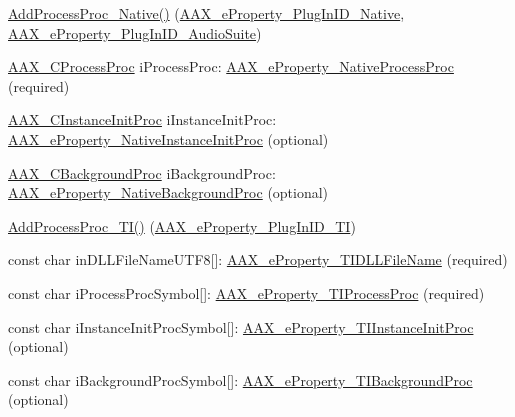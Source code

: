 \mbox{\hyperlink{a01781_a1c069508cf54a523905c8160ebf628ad}{Add\+Process\+Proc\+\_\+\+Native()}} (\mbox{\hyperlink{a00662_a13e384f22825afd3db6d68395b79ce0da89ca3dd6e96895cda14976c1b1ceb826}{A\+A\+X\+\_\+e\+Property\+\_\+\+Plug\+In\+I\+D\+\_\+\+Native}}, \mbox{\hyperlink{a00662_a13e384f22825afd3db6d68395b79ce0dad3344696b8298a8b254add3d039ea927}{A\+A\+X\+\_\+e\+Property\+\_\+\+Plug\+In\+I\+D\+\_\+\+Audio\+Suite}})
\begin{DoxyItemize}
\item \mbox{\hyperlink{a00401_ad6dd5e1aa5bd2f8462966685e3b26a6e}{A\+A\+X\+\_\+\+C\+Process\+Proc}} {\ttfamily i\+Process\+Proc\+:} \mbox{\hyperlink{a00662_a13e384f22825afd3db6d68395b79ce0da43e55994526d4623cab23fc3200d3762}{A\+A\+X\+\_\+e\+Property\+\_\+\+Native\+Process\+Proc}} (required)
\item \mbox{\hyperlink{a00401_a3963a850079d3186e08c97a1a4d0ef1c}{A\+A\+X\+\_\+\+C\+Instance\+Init\+Proc}} {\ttfamily i\+Instance\+Init\+Proc\+:} \mbox{\hyperlink{a00662_a13e384f22825afd3db6d68395b79ce0da0f182ea271ec0aa1a49dd9c995826ef5}{A\+A\+X\+\_\+e\+Property\+\_\+\+Native\+Instance\+Init\+Proc}} (optional)
\item \mbox{\hyperlink{a00401_aa64561d963284a3124a0821e7dc79c9a}{A\+A\+X\+\_\+\+C\+Background\+Proc}} {\ttfamily i\+Background\+Proc\+:} \mbox{\hyperlink{a00662_a13e384f22825afd3db6d68395b79ce0daee9d07e634f3f31988e0bbcfa33a6222}{A\+A\+X\+\_\+e\+Property\+\_\+\+Native\+Background\+Proc}} (optional)
\end{DoxyItemize}

\mbox{\hyperlink{a01781_a38f7fb30a378a17ce9635f5c36100a3b}{Add\+Process\+Proc\+\_\+\+T\+I()}} (\mbox{\hyperlink{a00662_a13e384f22825afd3db6d68395b79ce0da75f174df4efbeca86eaada126c1d9214}{A\+A\+X\+\_\+e\+Property\+\_\+\+Plug\+In\+I\+D\+\_\+\+TI}})
\begin{DoxyItemize}
\item {\ttfamily const char in\+D\+L\+L\+File\+Name\+U\+T\+F8\mbox{[}\mbox{]}}\+: \mbox{\hyperlink{a00662_a13e384f22825afd3db6d68395b79ce0daa38d1dee38945c7b0f5333b6cec02819}{A\+A\+X\+\_\+e\+Property\+\_\+\+T\+I\+D\+L\+L\+File\+Name}} (required)
\item {\ttfamily const char i\+Process\+Proc\+Symbol\mbox{[}\mbox{]}}\+: \mbox{\hyperlink{a00662_a13e384f22825afd3db6d68395b79ce0da1c4750cff6cd0dc467287edfb88ed495}{A\+A\+X\+\_\+e\+Property\+\_\+\+T\+I\+Process\+Proc}} (required)
\item {\ttfamily const char i\+Instance\+Init\+Proc\+Symbol\mbox{[}\mbox{]}}\+: \mbox{\hyperlink{a00662_a13e384f22825afd3db6d68395b79ce0dace404ac7f105c8bca24cf14e26479265}{A\+A\+X\+\_\+e\+Property\+\_\+\+T\+I\+Instance\+Init\+Proc}} (optional)
\item {\ttfamily const char i\+Background\+Proc\+Symbol\mbox{[}\mbox{]}}\+: \mbox{\hyperlink{a00662_a13e384f22825afd3db6d68395b79ce0dafcf70d8ff9b7a5853ce6248b8deeaeef}{A\+A\+X\+\_\+e\+Property\+\_\+\+T\+I\+Background\+Proc}} (optional)
\end{DoxyItemize}

